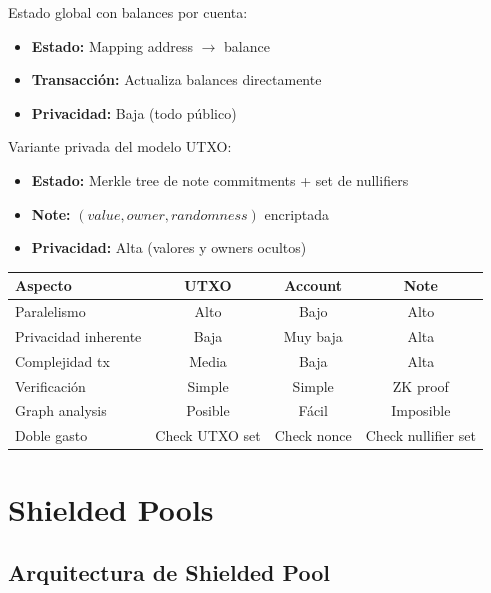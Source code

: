 \documentclass[11pt,a4paper,twoside]{book}
\begin{document}
\begin{definition}
Estado global con balances por cuenta:
\begin{itemize}
    \item \textbf{Estado:} Mapping address $\to$ balance
    \item \textbf{Transacci\'on:} Actualiza balances directamente
    \item \textbf{Privacidad:} Baja (todo p\'ublico)
\end{itemize}
\end{definition}

\begin{definition}
Variante privada del modelo UTXO:
\begin{itemize}
    \item \textbf{Estado:} Merkle tree de note commitments + set de nullifiers
    \item \textbf{Note:} $(value, owner, randomness)$ encriptada
    \item \textbf{Privacidad:} Alta (valores y owners ocultos)
\end{itemize}
\end{definition}

\begin{center}
\small
\begin{tabular}{lccc}
\toprule
\textbf{Aspecto} & \textbf{UTXO} & \textbf{Account} & \textbf{Note} \\
\midrule
Paralelismo & Alto & Bajo & Alto \\
Privacidad inherente & Baja & Muy baja & Alta \\
Complejidad tx & Media & Baja & Alta \\
Verificaci\'on & Simple & Simple & ZK proof \\
Graph analysis & Posible & F\'acil & Imposible \\
Doble gasto & Check UTXO set & Check nonce & Check nullifier set \\
\bottomrule
\end{tabular}
\end{center}

\section{Shielded Pools}
\label{sec:shielded-pools}

\subsection{Arquitectura de Shielded Pool}
\end{document}
